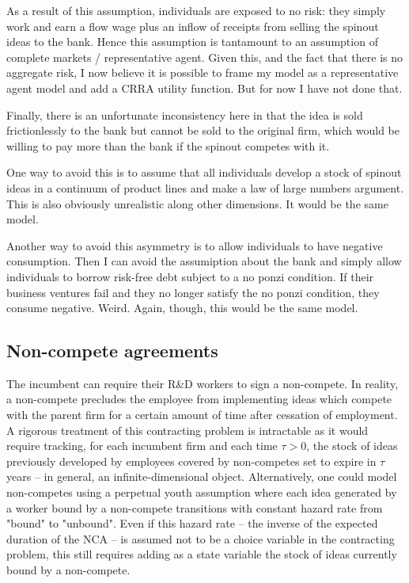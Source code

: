 \documentclass[12pt,english]{article}
\theoremstyle{remark}
\begin{document}
As a result of this assumption, individuals are exposed to no risk: they simply work and earn a flow wage plus an inflow of receipts from selling the spinout ideas to the bank. Hence this assumption is tantamount to an assumption of complete markets / representative agent. Given this, and the fact that there is no aggregate risk, I now believe it is possible to frame my model as a representative agent model and add a CRRA utility function. But for now I have not done that.

Finally, there is an unfortunate inconsistency here in that the idea is sold frictionlessly to the bank but cannot be sold to the original firm, which would be willing to pay more than the bank if the spinout competes with it. 

One way to avoid this is to assume that all individuals develop a stock of spinout ideas in a continuum of product lines and make a law of large numbers argument. This is also obviously unrealistic along other dimensions. It would be the same model.

Another way to avoid this asymmetry is to allow individuals to have negative consumption. Then I can avoid the assumiption about the bank and simply allow individuals to borrow risk-free debt subject to a no ponzi condition. If their business ventures fail and they no longer satisfy the no ponzi condition, they consume negative. Weird. Again, though, this would be the same model.




\subsection{Non-compete agreements}

The incumbent can require their R\&D workers to sign a non-compete. In reality, a non-compete precludes the employee from implementing ideas which compete with the parent firm for a certain amount of time after cessation of employment. A rigorous treatment of this contracting problem is intractable  as it would require tracking, for each incumbent firm and each time $\tau > 0$, the stock of ideas previously developed by employees covered by non-competes set to expire in $\tau$ years -- in general, an infinite-dimensional object. Alternatively, one could model non-competes using a perpetual youth assumption where each idea generated by a worker bound by a non-compete transitions with constant hazard rate from "bound" to "unbound". Even if this hazard rate -- the inverse of the expected duration of the NCA -- is assumed not to be a choice variable in the contracting problem, this still requires adding as a state variable the stock of ideas currently bound by a non-compete. 
\end{document}
